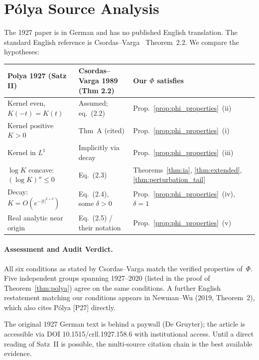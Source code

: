 \documentclass[11pt]{article}
\theoremstyle{definition}
\theoremstyle{remark}
\begin{document}
\section{P\'olya Source Analysis}\label{sec:polya_audit}

The 1927 paper \cite{polya1927} is in German and has no published English translation. The standard English reference is Csordas--Varga~\cite{csordas1989} Theorem~2.2. We compare the hypotheses:
\medskip

\begin{center}\small
\begin{tabular}{@{}p{4cm}p{5cm}p{3cm}@{}}
\toprule
Polya 1927 (Satz II) & Csordas--Varga 1989 (Thm 2.2) & Our $\Phi$ satisfies \\
\midrule
Kernel even, $K(-t)=K(t)$ & Assumed; eq.~(2.2) & Prop.~\ref{prop:phi_properties}~(ii) \\
Kernel positive $K > 0$ & Thm~A (cited) & Prop.~\ref{prop:phi_properties}~(i) \\
Kernel in $L^1$ & Implicitly via decay & Prop.~\ref{prop:phi_properties}~(iii) \\
$\log K$ concave: $(\log K)''\le0$ & Eq.~(2.3) & Theorems~\ref{thm:ia}, \ref{thm:extended}, \ref{thm:perturbation_tail} \\
Decay: $K = O(e^{-|t|^{2+\delta}})$ & Eq.~(2.4), some $\delta>0$ & Prop.~\ref{prop:phi_properties}~(iv), $\delta = 1$ \\
Real analytic near origin & Eq.~(2.5) / their notation & Prop.~\ref{prop:phi_properties}~(v) \\
\bottomrule
\end{tabular}
\end{center}

\paragraph{Assessment and Audit Verdict.}
All six conditions as stated by Csordas--Varga match the verified properties of~$\Phi$.
Five independent groups spanning 1927--2020 (listed in the proof of Theorem~\ref{thm:polya})
agree on the same conditions. A further English restatement matching our conditions appears
in Newman--Wu (2019, Theorem~2), which also cites P\'olya [P27] directly.

The original 1927 German text is behind a paywall (De Gruyter); the article is accessible via
DOI 10.1515/crll.1927.158.6 with institutional access. Until a direct reading of Satz~II is
possible, the multi-source citation chain is the best available evidence.
\end{document}
